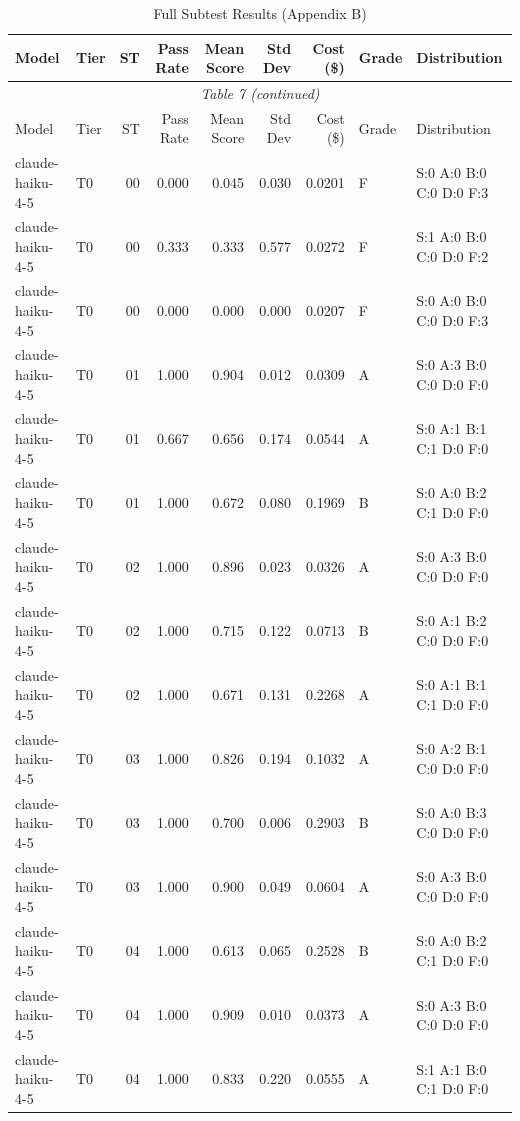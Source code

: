 \begin{longtable}{llrrrrrll}
\caption{Full Subtest Results (Appendix B)} \label{tab:subtest_detail} \\
\toprule
Model & Tier & ST & Pass Rate & Mean Score & Std Dev & Cost (\$) & Grade & Distribution \\
\midrule
\endfirsthead
\multicolumn{9}{c}{\textit{Table 7 (continued)}} \\
\toprule
Model & Tier & ST & Pass Rate & Mean Score & Std Dev & Cost (\$) & Grade & Distribution \\
\midrule
\endhead
\bottomrule
\endfoot
claude-haiku-4-5 & T0 & 00 & 0.000 & 0.045 & 0.030 & 0.0201 & F & \tiny S:0 A:0 B:0 C:0 D:0 F:3 \\
claude-haiku-4-5 & T0 & 00 & 0.333 & 0.333 & 0.577 & 0.0272 & F & \tiny S:1 A:0 B:0 C:0 D:0 F:2 \\
claude-haiku-4-5 & T0 & 00 & 0.000 & 0.000 & 0.000 & 0.0207 & F & \tiny S:0 A:0 B:0 C:0 D:0 F:3 \\
claude-haiku-4-5 & T0 & 01 & 1.000 & 0.904 & 0.012 & 0.0309 & A & \tiny S:0 A:3 B:0 C:0 D:0 F:0 \\
claude-haiku-4-5 & T0 & 01 & 0.667 & 0.656 & 0.174 & 0.0544 & A & \tiny S:0 A:1 B:1 C:1 D:0 F:0 \\
claude-haiku-4-5 & T0 & 01 & 1.000 & 0.672 & 0.080 & 0.1969 & B & \tiny S:0 A:0 B:2 C:1 D:0 F:0 \\
claude-haiku-4-5 & T0 & 02 & 1.000 & 0.896 & 0.023 & 0.0326 & A & \tiny S:0 A:3 B:0 C:0 D:0 F:0 \\
claude-haiku-4-5 & T0 & 02 & 1.000 & 0.715 & 0.122 & 0.0713 & B & \tiny S:0 A:1 B:2 C:0 D:0 F:0 \\
claude-haiku-4-5 & T0 & 02 & 1.000 & 0.671 & 0.131 & 0.2268 & A & \tiny S:0 A:1 B:1 C:1 D:0 F:0 \\
claude-haiku-4-5 & T0 & 03 & 1.000 & 0.826 & 0.194 & 0.1032 & A & \tiny S:0 A:2 B:1 C:0 D:0 F:0 \\
claude-haiku-4-5 & T0 & 03 & 1.000 & 0.700 & 0.006 & 0.2903 & B & \tiny S:0 A:0 B:3 C:0 D:0 F:0 \\
claude-haiku-4-5 & T0 & 03 & 1.000 & 0.900 & 0.049 & 0.0604 & A & \tiny S:0 A:3 B:0 C:0 D:0 F:0 \\
claude-haiku-4-5 & T0 & 04 & 1.000 & 0.613 & 0.065 & 0.2528 & B & \tiny S:0 A:0 B:2 C:1 D:0 F:0 \\
claude-haiku-4-5 & T0 & 04 & 1.000 & 0.909 & 0.010 & 0.0373 & A & \tiny S:0 A:3 B:0 C:0 D:0 F:0 \\
claude-haiku-4-5 & T0 & 04 & 1.000 & 0.833 & 0.220 & 0.0555 & A & \tiny S:1 A:1 B:0 C:1 D:0 F:0 \\

\end{longtable}
